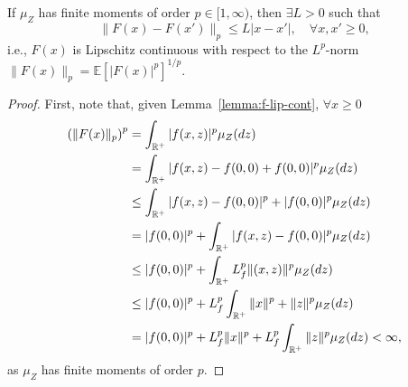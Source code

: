 \documentclass[12pt]{article}
\begin{document}
\begin{lemma}[\citet{burtscheidtBilevelLinearOptimization2020}, Lemma~17.2.4\footnote{Except the case for probability measures with finite moments of order $p=\infty$.}] 
    If $\mu_Z$ has finite moments of order $p\in [1,\infty)$, then $\exists L>0$ such that \[
	\|F(x) - F(x')\|_p \le L |x - x'|,\quad \forall x,x' \ge 0
    ,\] i.e., $F(x)$ is Lipschitz continuous with respect to the $L^p$-norm $\|F(x)\|_p = \mathbb{E}[|F(x)|^{p}]^{1 / p}$.
\end{lemma}
\begin{proof}
    First, note that, given Lemma~\ref{lemma:f-lip-cont}, $\forall x \ge 0$
    \begin{align*}
	\left( \|F(x)\|_p \right)^{p} &= \int_{\mathbb{R}^+} |f(x,z)|^{p} \mu_Z(dz)  \\
	&= \int_{\mathbb{R}^+} |f(x,z) - f(0,0) + f(0,0)|^{p} \mu_Z(dz)  \\
	&\le  \int_{\mathbb{R}^+} |f(x,z) - f(0,0)|^{p} + |f(0,0)|^{p} \mu_Z(dz)  \\
	&=  |f(0,0)|^{p} + \int_{\mathbb{R}^+} |f(x,z) - f(0,0)|^{p} \mu_Z(dz) \\
	&\le |f(0,0)|^{p} + \int_{\mathbb{R}^+} L_f^{p} \|(x,z)\|^{p} \mu_Z(dz) \\
	&\le |f(0,0)|^{p} + L_f^{p} \int_{\mathbb{R}^+} \|x\|^{p} + \|z\|^{p} \mu_Z(dz) \\
	&= |f(0,0)|^{p} + L_f^{p} \|x\|^{p} + L_f^{p} \int_{\mathbb{R}^+}\|z\|^{p} \mu_Z(dz) < \infty
    ,\end{align*}
    as $\mu_Z$ has finite moments of order $p$.
\end{proof}




% 
\printbibliography
    
\end{document}
